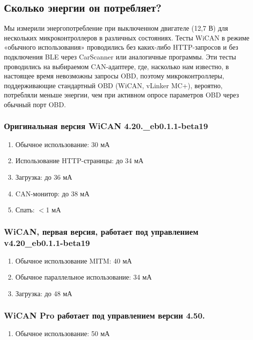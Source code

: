 \documentclass[superscriptaddress,onecolumn,floatfix]{revtex4-2}
\begin{document}
\subsection{Сколько энергии он потребляет?}

Мы измерили энергопотребление при выключенном двигателе (12,7 В) для нескольких микроконтроллеров в различных состояниях. Тесты WiCAN в режиме «обычного использования» проводились без каких-либо HTTP-запросов и без подключения BLE через CarScanner или аналогичные программы. Эти тесты проводились на выбираемом CAN-адаптере, где, насколько нам известно, в настоящее время невозможны запросы OBD, поэтому микроконтроллеры, поддерживающие стандартный OBD (WiCAN, vLinker MC+), вероятно, потребляли меньше энергии, чем при активном опросе параметров OBD через обычный порт OBD. 

\subsubsection{Оригинальная версия WiCAN 4.20.\_eb0.1.1-beta19}
\begin{enumerate}
  \item{Обычное использование:} 30 мА
  \item{Использование HTTP-страницы:} до 34 мА
  \item{Загрузка:} до 36 мА
  \item{CAN-монитор:} до 38 мА
  \item{Спать:} $<$1 мА
\end{enumerate}

\subsubsection{WiCAN, первая версия, работает под управлением v4.20\_eb0.1.1-beta19}
\begin{enumerate}
  \item{Обычное использование MITM:} 40 мА
  \item{Обычное параллельное использование:} 34 мА
  \item{Загрузка:} до 48 мА
\end{enumerate}

\subsubsection{WiCAN Pro работает под управлением версии 4.50.}
\begin{enumerate}
  \item{Обычное использование:} 50 мА
\end{enumerate}
\end{document}
